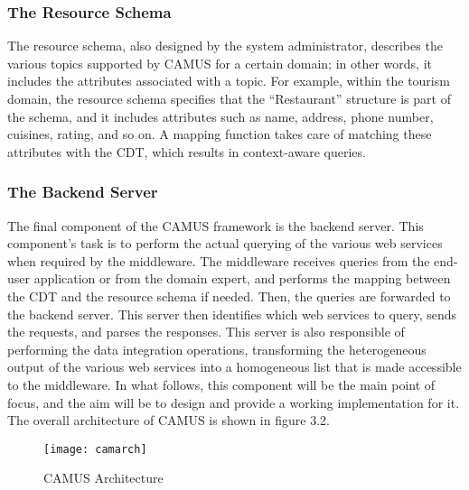 \subsubsection{The Resource Schema}
The resource schema, also designed by the system administrator, describes the various topics supported by CAMUS for a certain domain; in other words, it includes the attributes associated with a topic. For example, within the tourism domain, the resource schema specifies that the ``Restaurant'' structure is part of the schema, and it includes attributes such as name, address, phone number, cuisines, rating, and so on. A mapping function takes care of matching these attributes with the CDT, which results in context-aware queries.
\subsubsection{The Backend Server}
The final component of the CAMUS framework is the backend server. This component's task is to perform the actual querying of the various web services when required by the middleware. The middleware receives queries from the end-user application or from the domain expert, and performs the mapping between the CDT and the resource schema if needed. Then, the queries are forwarded to the backend server. This server then identifies which web services to query, sends the requests, and parses the responses. This server is also responsible of performing the data integration operations, transforming the heterogeneous output of the various web services into a homogeneous list that is made accessible to the middleware. In what follows, this component will be the main point of focus, and the aim will be to design and provide a working implementation for it.
\newpage
The overall architecture of CAMUS is shown in figure 3.2.
\begin{figure}[h]
\texttt{[image: camarch]}
\caption{CAMUS Architecture}
\end{figure}

